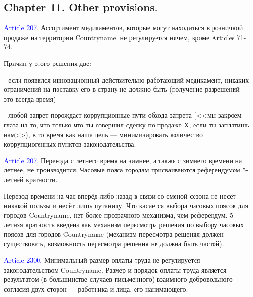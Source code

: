 \documentclass[11pt]{article}
\theoremstyle{remark}
\theoremstyle{definition}
\begin{document}
\subsection*{Chapter 11. Other provisions.}







\textcolor{blue}{Article 207.} Ассортимент медикаментов, которые могут находиться в розничной продаже на территории Countryname, не регулируется ничем, кроме Articles 71-74.

\color{blue}

Причин у этого решения две:

- если появился инновационный действительно работающий медикамент, никаких ограничений на поставку его в страну не должно быть (получение разрешений это всегда время)

- любой запрет порождает коррупционные пути обхода запрета (<<мы закроем глаза на то, что только что ты совершил сделку по продаже Х, если ты заплатишь нам>>), в то время как наша цель --- минимизировать количество коррупциогенных пунктов законодательства.

\color{black}

\textcolor{blue}{Article 207.} Перевода с летнего время на зимнее, а также с зимнего времени на летнее, не производится. Часовые пояса городам присваиваются референдумом 5-летней кратности.

\color{blue}

Перевод времени на час вперёд либо назад в связи со сменой сезона не несёт никакой пользы и несёт лишь путаницу. Что касается выбора часовых поясов для городов Countryname, нет более прозрачного механизма, чем референдум. 5-летняя кратность введена как механизм пересмотра решения по выбору часовых поясов для городов Countryname (механизм пересмотра решения должен существовать, возможность пересмотра решения не должна быть частой).

\color{black}


\textcolor{blue}{Article 2300.} Минимальный размер оплаты труда не регулируется законодательством Countryname. Размер и порядок оплаты труда является результатом (в большинстве случаев письменного) взаимного добровольного согласия двух сторон --- работника и лица, его нанимающего.

\color{blue}



\end{document}
